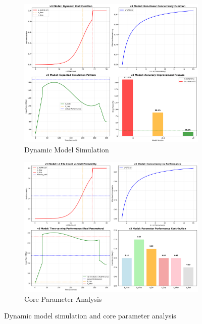 \documentclass[11pt]{article}
\begin{document}
\begin{figure}[H]
\centering
\begin{subfigure}{0.48\textwidth}
\centering
\includegraphics[width=\textwidth]{experiments/2025-09-05/v3_model_simulation_visualization.png}
\caption{Dynamic Model Simulation}
\label{fig:model_simulation}
\end{subfigure}
\hfill
\begin{subfigure}{0.48\textwidth}
\centering
\includegraphics[width=\textwidth]{experiments/2025-09-05/v3_core_parameter_analysis.png}
\caption{Core Parameter Analysis}
\label{fig:core_parameters}
\end{subfigure}
\caption{Dynamic model simulation and core parameter analysis}
\end{figure}
\end{document}
